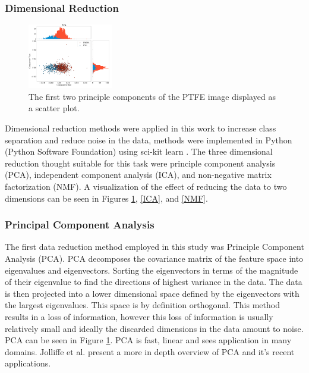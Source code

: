 \documentclass[a4paper,11pt]{article}
\begin{document}
\subsubsection{Dimensional Reduction}

\begin{figure}
  
  \begin{center}
    \includegraphics[width=0.33\textwidth]{figures/PCAnone.png}
  \end{center}
  
  \caption{The first two principle components of the PTFE image displayed as a scatter plot.}
  \label{PCA}
  
\end{figure}

Dimensional reduction methods were applied in this work to increase class separation and reduce noise in the data, methods were implemented in Python (Python Software Foundation) using sci-kit learn \cite{Pedregosa2011Scikit-learn:Python}. The three dimensional reduction thought suitable for this task were principle component analysis (PCA), independent component analysis (ICA), and non-negative matrix factorization (NMF). A visualization of the effect of reducing the data to two dimensions can be seen in Figures \ref{PCA}, \ref{ICA}, and \ref{NMF}.

\subsubsection{Principal Component Analysis}

The first data reduction method employed in this study was Principle Component Analysis (PCA). PCA decomposes the covariance matrix of the feature space into eigenvalues and eigenvectors. Sorting the eigenvectors in terms of the magnitude of their eigenvalue to find the directions of highest variance in the data. The data is then projected into a lower dimensional space defined by the eigenvectors with the largest eigenvalues. This space is by definition orthogonal. This method results in a loss of information, however this loss of information is usually relatively small and ideally the discarded dimensions in the data amount to noise. PCA can be seen in Figure \ref{PCA}. PCA is fast, linear and sees application in many domains. Jolliffe et al. \cite{Jolliffe2016PrincipalDevelopments.} present a more in depth overview of PCA and it's recent applications.
\end{document}
